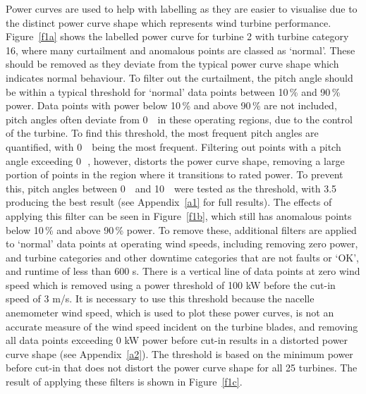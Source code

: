 Power curves are used to help with labelling as they are easier to visualise due to the distinct power curve shape which represents wind turbine performance. Figure~\ref{f1a} shows the labelled power curve for turbine 2 with turbine category 16, where many curtailment and anomalous points are classed as `normal'. These should be removed as they deviate from the typical power curve shape which indicates normal behaviour. To filter out the curtailment, the pitch angle should be within a typical threshold for `normal' data points between 10\,\% and 90\,\% power. Data points with power below 10\,\% and above 90\,\% are not included, pitch angles often deviate from 0\,\textdegree~ in these operating regions, due to the control of the turbine. To find this threshold, the most frequent pitch angles are quantified, with 0\,\textdegree~ being the most frequent. Filtering out points with a pitch angle exceeding 0\,\textdegree~, however, distorts the power curve shape, removing a large portion of points in the region where it transitions to rated power. To prevent this, pitch angles between 0\,\textdegree~ and 10\,\textdegree~ were tested as the threshold, with 3.5\,\textdegree~ producing the best result (see Appendix~\ref{a1} for full results). The effects of applying this filter can be seen in Figure~\ref{f1b}, which still has anomalous points below 10\,\% and above 90\,\% power. To remove these, additional filters are applied to `normal' data points at operating wind speeds, including removing zero power, and turbine categories and other downtime categories that are not faults or `OK', and runtime of less than 600 s. There is a vertical line of data points at zero wind speed which is removed using a power threshold of 100 kW before the cut-in speed of 3 m/s. It is necessary to use this threshold because the nacelle anemometer wind speed, which is used to plot these power curves, is not an accurate measure of the wind speed incident on the turbine blades, and removing all data points exceeding 0 kW power before cut-in results in a distorted power curve shape (see Appendix~\ref{a2}). The threshold is based on the minimum power before cut-in that does not distort the power curve shape for all 25 turbines. The result of applying these filters is shown in Figure~\ref{f1c}.

